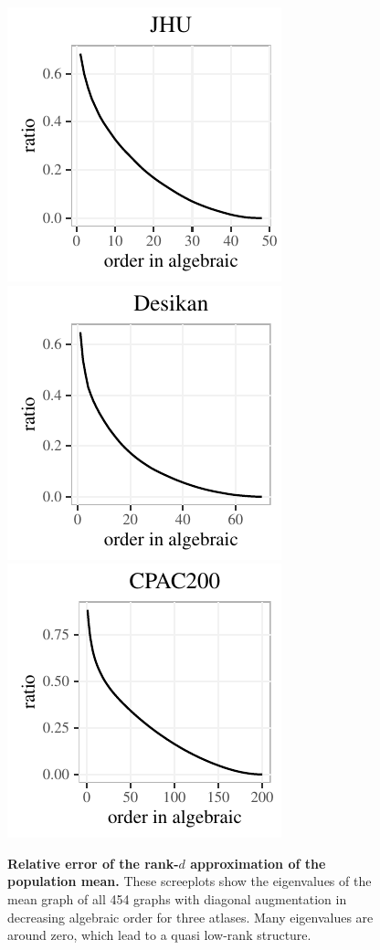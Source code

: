 \documentclass[10pt,letterpaper]{article}
\begin{document}
\begin{figure}[!htbp]
\centering
\includegraphics[height=.2\textheight]{screeplot_ratio_JHU.pdf} 
\includegraphics[height=.2\textheight]{screeplot_ratio_desikan.pdf} 
\includegraphics[height=.2\textheight]{screeplot_ratio_CPAC200.pdf}
\caption{{\bf Relative error of the rank-$d$ approximation of the population mean.}
These screeplots show the eigenvalues of the mean graph of all 454 graphs with diagonal augmentation in decreasing algebraic order for three atlases. Many eigenvalues are around zero, which lead to a quasi low-rank structure.
}
\label{fig:screeplot}
\end{figure}
\end{document}
